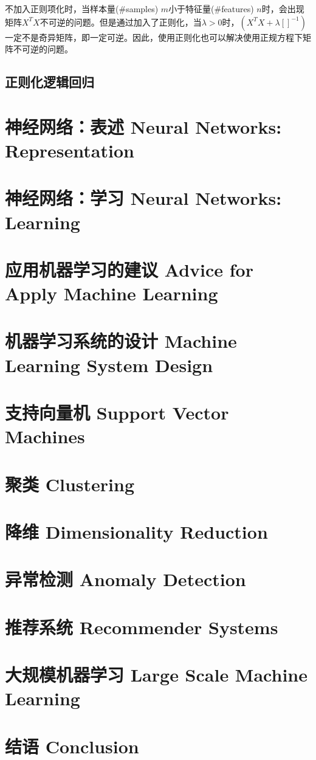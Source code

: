 \documentclass[12pt, a4paper]{article}
\begin{document}
不加入正则项化时，当样本量($\#$samples) $m$小于特征量($\#$features) $n$时，会出现矩阵$X^TX$不可逆的问题。但是通过加入了正则化，当$\lambda>0$时，$(X^TX+\lambda[ ]^{-1})$一定不是奇异矩阵，即一定可逆。因此，使用正则化也可以解决使用正规方程下矩阵不可逆的问题。

\subsection{正则化逻辑回归}

\section{神经网络：表述 Neural Networks: Representation}

\section{神经网络：学习 Neural Networks: Learning}

\section{应用机器学习的建议 Advice for Apply Machine Learning}

\section{机器学习系统的设计 Machine Learning System Design}

\section{支持向量机 Support Vector Machines}

\section{聚类 Clustering}

\section{降维 Dimensionality Reduction}

\section{异常检测 Anomaly Detection}

\section{推荐系统 Recommender Systems}

\section{大规模机器学习 Large Scale Machine Learning}

\section{结语 Conclusion}
\end{document}
